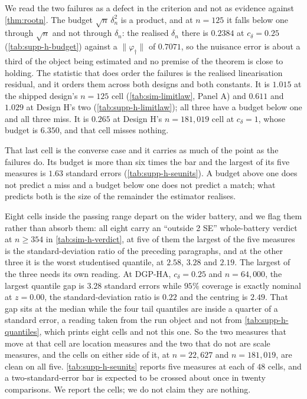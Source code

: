 \documentclass[
  12pt]{article}
\newcommand{\1}[1]{\mathds{1}\left[#1\right]}
\theoremstyle{plain}
\theoremstyle{definition}
\theoremstyle{definition}
\theoremstyle{remark}
\newcommand{\vdagger}{\varphi_{\dagger}}
\begin{document}
We read the two failures as a defect in the criterion and not as evidence against
\cref{thm:rootn}. The budget $\sqrt n\,\delta_n^{2}$ is a product, and at $n=125$
it falls below one through $\sqrt n$ and not through $\delta_n$: the realised
$\delta_n$ there is $0.2384$ at $c_\delta=0.25$ (\cref{tab:supp-h-budget})
against a $\|\vdagger\|$ of $0.7071$, so the nuisance error is about a third of
the object being estimated and no premise of the theorem is close to holding. The
statistic that does order the failures is the realised linearisation residual,
and it orders them across both designs and both constants. It is $1.015$ at the
shipped design's $n=125$ cell (\cref{tab:sim-limitlaw}, Panel A) and $0.611$ and
$1.029$ at Design H's two (\cref{tab:supp-h-limitlaw}); all three have a budget
below one and all three miss. It is $0.265$ at Design H's $n=181{,}019$ cell at
$c_\delta=1$, whose budget is $6.350$, and that cell misses nothing.

That last cell is the converse case and it carries as much of the point as the
failures do. Its budget is more than six times the bar and the largest of its
five measures is $1.63$ standard errors (\cref{tab:supp-h-seunits}). A budget
above one does not predict a miss and a budget below one does not predict a
match; what predicts both is the size of the remainder the estimator realises.

Eight cells inside the passing range depart on the wider battery, and we flag
them rather than absorb them: all eight carry an ``outside 2 SE'' whole-battery
verdict at $n\ge354$ in \cref{tab:sim-h-verdict}, at five of them the largest of
the five measures is the standard-deviation ratio of the preceding paragraphs,
and at the other three it is the worst studentised quantile, at $2.58$, $3.28$
and $2.19$. The largest of the three needs its own reading. At DGP-HA,
$c_\delta=0.25$ and $n=64{,}000$, the largest quantile gap is $3.28$
standard errors while $95\%$ coverage is exactly nominal at $z=0.00$, the
standard-deviation ratio is $0.22$ and the centring is $2.49$. That gap sits at
the median while the four tail quantiles are inside a quarter of a standard
error, a reading taken from the run object and not from \cref{tab:supp-h-quantiles}, which prints eight cells and not this one. So the two measures that
move at that cell are location measures and the two that do not are scale
measures, and the cells on either side of it, at $n=22{,}627$ and
$n=181{,}019$, are clean on all five. \cref{tab:supp-h-seunits} reports five
measures at each of $48$ cells, and a two-standard-error bar is expected to be
crossed about once in twenty comparisons. We report the cells; we do not claim
they are nothing.
\end{document}
